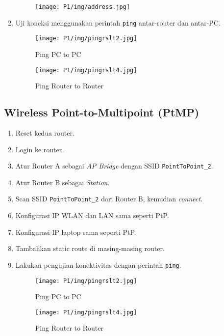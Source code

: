\begin{enumerate}
  \begin{figure}[H]
    \texttt{[image: P1/img/address.jpg]}
\end{figure}

  \item Uji koneksi menggunakan perintah \texttt{ping} antar-router dan antar-PC.

\begin{figure}[H]
  \centering
  \begin{minipage}[t]{0.48\textwidth}
    \centering
    \texttt{[image: P1/img/pingrslt2.jpg]}
    \caption{Ping PC to PC}
    \label{fig:production}
  \end{minipage}
  \hfill
  \begin{minipage}[t]{0.48\textwidth}
    \centering
    \texttt{[image: P1/img/pingrslt4.jpg]}
    \caption{Ping Router to Router}
    \label{fig:admin}
  \end{minipage}
\end{figure}
  
\end{enumerate}

\subsection{Wireless Point-to-Multipoint (PtMP)}

\begin{enumerate}
  \item Reset kedua router.
  \item Login ke router.
  \item Atur Router A sebagai \textit{AP Bridge} dengan SSID \texttt{PointToPoint\_2}.
  \item Atur Router B sebagai \textit{Station}.
  \item Scan SSID \texttt{PointToPoint\_2} dari Router B, kemudian \textit{connect}.
  \item Konfigurasi IP WLAN dan LAN sama seperti PtP.
  \item Konfigurasi IP laptop sama seperti PtP.
  \item Tambahkan static route di masing-masing router.
  \item Lakukan pengujian konektivitas dengan perintah \texttt{ping}.

  \begin{figure}[H]
  \centering
  \begin{minipage}[t]{0.48\textwidth}
    \centering
    \texttt{[image: P1/img/pingrslt2.jpg]}
    \caption{Ping PC to PC}
    \label{fig:production}
  \end{minipage}
  \hfill
  \begin{minipage}[t]{0.48\textwidth}
    \centering
    \texttt{[image: P1/img/pingrslt4.jpg]}
    \caption{Ping Router to Router}
    \label{fig:admin}
  \end{minipage}
\end{figure}

\end{enumerate}

